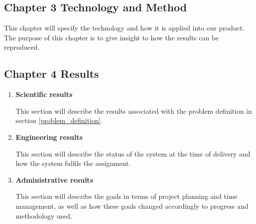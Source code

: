 \subsection{Chapter 3 Technology and Method}
This chapter will specify the technology and how it is applied into our product. The purpose of this chapter is to give insight to how the results can be reproduced.

\subsection{Chapter 4 Results}
\begin{enumerate}
    \item \textbf{Scientific results}
    
    This section will describe the results associated with the problem definition in section \ref{problem_definition}.
    
    \item \textbf{Engineering results}
    
    This section will describe the status of the system at the time of delivery and how the system fulfils the assignment.
    
    \item \textbf{Administrative results}
    
    This section will describe the goals in terms of project planning and time management, as well as how these goals changed accordingly to progress and methodology used.
\end{enumerate}

